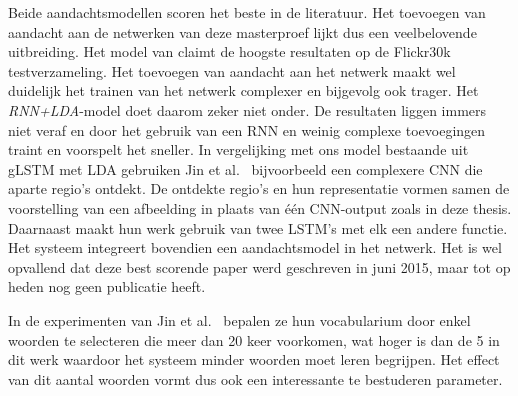 Beide aandachtsmodellen scoren het beste in de literatuur. Het toevoegen van aandacht aan de netwerken van deze masterproef lijkt dus een veelbelovende uitbreiding.
Het model van \cite{Jin2015} claimt de hoogste resultaten op de Flickr30k testverzameling.
Het toevoegen van aandacht aan het netwerk maakt wel duidelijk het trainen van het netwerk complexer en bijgevolg ook trager.
Het \emph{RNN+LDA}-model doet daarom zeker niet onder. De resultaten liggen immers niet veraf en door het gebruik van een RNN en weinig complexe toevoegingen traint en voorspelt het sneller.
In vergelijking met ons model bestaande uit gLSTM met LDA gebruiken Jin et al.~\cite{Jin2015} bijvoorbeeld een complexere CNN die aparte regio's ontdekt. De ontdekte regio's en hun representatie vormen samen de voorstelling van een afbeelding in plaats van \'e\'en CNN-output zoals in deze thesis. Daarnaast maakt hun werk gebruik van twee LSTM's met elk een andere functie. Het systeem integreert bovendien een aandachtsmodel in het netwerk.
Het is wel opvallend dat deze best scorende paper werd geschreven in juni 2015, maar tot op heden nog geen publicatie heeft.

In de experimenten van Jin et al.~\cite{Jin2015} bepalen ze hun vocabularium door enkel woorden te selecteren die meer dan 20 keer voorkomen, wat hoger is dan de 5 in dit werk waardoor het systeem minder woorden moet leren begrijpen. Het effect van dit aantal woorden vormt dus ook een interessante te bestuderen parameter.

